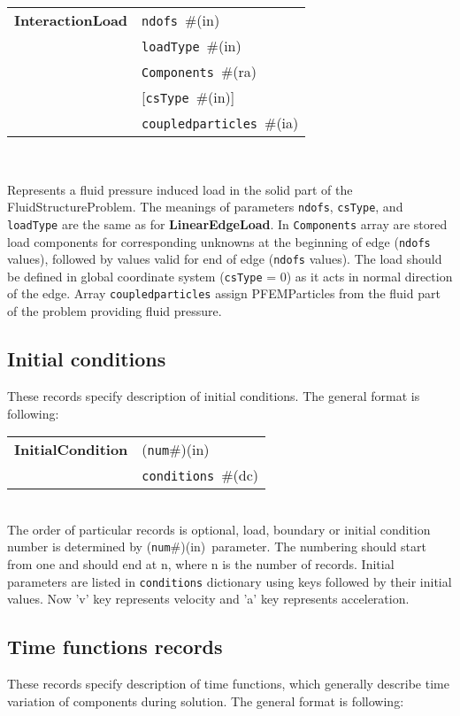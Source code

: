 \documentclass[a4paper]{article}
\newcommand{\param}[1]{\texttt{#1}} %
\newcommand{\optional}[1]{[#1]} %
\newcommand{\field}[2]{\param{#1}~\#{\tiny(#2)}} %
\newcommand{\optField}[2]{\optional{\field{#1}{#2}}}
\newcommand{\componentNum}{(\param{num}\#){\tiny(in)}} %
\newcommand{\entKeywordInst}[1]{\textbf{#1}} %
\newenvironment{record}[1][]{\begin{tabular}{|ll}}{\end{tabular}\\}
\newcommand{\recentry}[2]{{#1}&{#2}\\}
\newcounter{rcc}
\newenvironment{record}[1][\textwidth]{\setcounter{rcc}{0}\rowcolors{1}{lightgray}{lightgray}\tabularx{#1}{llR} \hline}
               {\endtabularx}
\newcommand{\recentry}[2]{\ifthenelse{\value{rcc}>0}{$\backslash$ \\}{\setcounter{rcc}{1}}{#1}&{#2}&}
\begin{document}
\begin{itemize}
\begin{record}[0.9\textwidth]
  \recentry{\entKeywordInst{InteractionLoad}}{\field{ndofs}{in}}
  \recentry{}{\field{loadType}{in}}
  \recentry{}{\field{Components}{ra}}
  \recentry{}{\optField{csType}{in}}
  \recentry{}{\field{coupledparticles}{ia}}
\end{record}

Represents a fluid pressure induced load in the solid part of the FluidStructureProblem. 
The meanings of parameters \param{ndofs},
\param{csType}, and \param{loadType} are the same as for
\entKeywordInst{LinearEdgeLoad}. In \param{Components}
array are stored load components for corresponding unknowns at the
beginning of edge (\param{ndofs} values), followed by values valid for
end of edge (\param{ndofs} values). The load should be defined in global 
coordinate system (\param{csType} = 0) as it acts in normal direction of the edge.
Array \param{coupledparticles} assign PFEMParticles from the fluid part of the problem 
providing fluid pressure.

\end{itemize}


\subsection{Initial conditions}
\label{_InitialConditions}
These records specify description of initial conditions. The general format is
following:

\noindent
\begin{record}
  \recentry{\entKeywordInst{InitialCondition}}{\componentNum}
  \recentry{}{\field{conditions}{dc}}
\end{record}
The order of particular  records is optional, load, boundary or initial condition number is determined by \componentNum\ parameter.
The numbering should start from one and should end at n, where n is the number of records.
Initial parameters are listed in \param{conditions} dictionary using keys followed by their initial values.
Now 'v' key represents velocity and 'a' key represents acceleration.



\subsection{Time functions records}
\label{_TimeFunctionsRecords}
These records specify description of time functions, which generally describe
time variation of components during solution. The  general format is
following:
\end{document}
